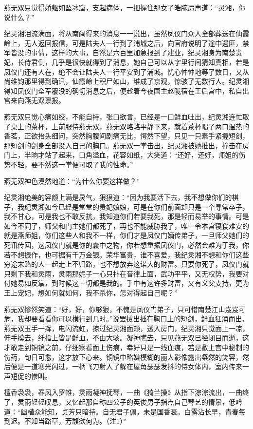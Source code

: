 燕无双只觉得娇躯如坠冰窟，支起病体，一把握住那女子皓腕厉声道：“灵湘，你说什么？”

纪灵湘泪流满面，将从南闽得来的消息一一说出，虽然凤仪门众人全部葬送在仙霞岭上，无人返回报信，可是陆夫人一行到了浦城之后，向官府说明了途中遇匪，禁军皆没的事情，这样的大事，自然是六百里加急报到了建业，纪灵湘身为南楚贵妃，长侍君侧，几乎是很快就得到了消息，她自己可以从字里行间猜知真相，若是凤仪门还有人在，绝不会让陆夫人一行平安到了浦城。忧心忡忡地等了数日，又从尚维钧那里得到确讯，仙霞岭上积尸如山，堆成了京观，惊骇了无数行人。纪灵湘得知凤仪门全军覆没的确切消息之后，便趁着今夜国主赵陇宿在王后宫中，私自出宫来向燕无双禀报。

燕无双只觉心痛如绞，不能自持，张口欲言，已经是一口鲜血吐出，纪灵湘连忙取了桌上的茶杯，上前服侍燕无双，燕无双略略平静下来，就着茶杯喝了两口温热的香茗，正欲抬头细问，突然胸腹间剧痛无比，愕然下望，只见一只素手紧握短剑，那短剑的剑身全部没入自己的胸口。燕无双一掌击出，纪灵湘被她推出，撞击在房门上，半晌才站了起来，口角溢血，花容如纸，大笑道：“还好，还好，师姐的伤势不轻，要不然这一掌便可取了我的性命。”

燕无双神色漠然地道：“为什么你要这样做？”

纪灵湘绝美的容颜上满是戾气，狠狠道：“因为我要活下去，我不想做你们的棋子，我纪灵湘如今已经是堂堂的贵妃娘娘，可是在你们前面却只是一个寻常卒子，我不甘心，可是我也不敢反抗，我知道你们若要我死，那是轻而易举的事情。可是如今不同了，师父和门主她们都死了，再也不能威胁我了，唯一令本宫寝食难安的就是燕师姐，你们这些人和我不一样，你们才是凤仪门嫡传弟子，一旦师父她们的死讯传回，这凤仪门就是你的囊中之物，你若想重振凤仪门，必然会难为于我，你若不想振作，也可据有千万金银。荣华富贵，谁不喜爱，我纪灵湘不想和你们这些穷途末路的人一起走上不归路，也不想放弃这诺大的财富。只要你死了，凤仪门就只剩下我和灵雨，灵雨那妮子一心只扑在音律上面，武功平平，又无权势，我要对付她易如反掌，到时候这一切都是我的。手中有这许多财富，又有义父支持，更为王上宠妃，想如何就如何，我不杀你，怎对得起自己呢？”

燕无双惨然笑道：“好，好，你够狠，不愧是凤仪门弟子，只可惜南楚江山岌岌可危，我却要看看你可以横行到几时。”说罢拔出插在胸口上的短剑，鲜血狂涌而出，燕无双玉手一挥，电闪流虹，掠过纪灵湘面颊，透入房门，纪灵湘只觉面上一凉，伸手摸去，纤指上皆是鲜血，不由大骇。凝神瞧去，只见燕无双已经闭目而逝，这才敢走到铜镜之前，仔细察看面上伤痕，幸好只是一线血痕，若是敷上宫中秘制的伤药，旬日可愈，这才放下心来。铜镜中略嫌模糊的丽人影像露出粲然的笑容，然后便是一道寒光闪过，一柄飞刀射入了躲在屋角瑟瑟发抖的侍女体内，室内传来一声短促的惨叫。

檀香袅袅，春风入罗帷，灵雨凝神抚琴，一曲《猗兰操》从指下淙淙流出，一曲终了，灵雨轻轻叹息，又忆起那自称四公子的英俊男子指点自己琴艺的情景，低吟道：“幽植众能知，贞芳只暗持。自无君子佩，未是国香衰。白露沾长早，青春每到迟。不知当路草，芳馥欲何为。（注1）”


